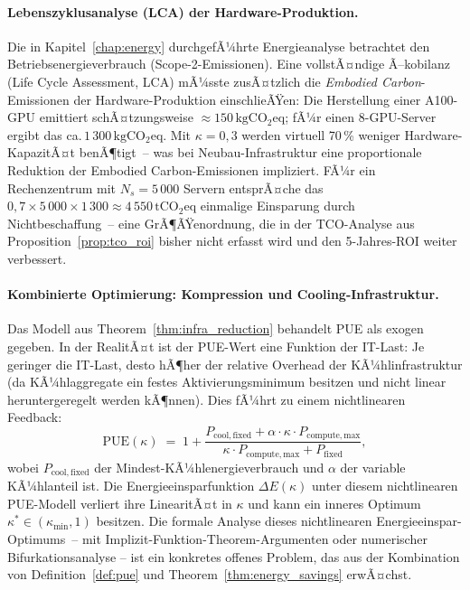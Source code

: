 ﻿\documentclass[12pt, a4paper, openany]{report}
\begin{document}
\paragraph{Lebenszyklusanalyse (LCA) der Hardware-Produktion.}
Die in Kapitel~\ref{chap:energy} durchgefÃ¼hrte Energieanalyse betrachtet
den Betriebsenergieverbrauch (Scope-2-Emissionen).  Eine vollstÃ¤ndige
Ã–kobilanz (Life Cycle Assessment, LCA) mÃ¼sste zusÃ¤tzlich die
\emph{Embodied Carbon}-Emissionen der Hardware-Produktion einschlieÃŸen:
Die Herstellung einer A100-GPU emittiert schÃ¤tzungsweise
$\approx 150\,\mathrm{kgCO_2eq}$; fÃ¼r einen 8-GPU-Server ergibt das
ca.\,$1\,300\,\mathrm{kgCO_2eq}$.  Mit $\kappa = 0{,}3$ werden virtuell
70\,\% weniger Hardware-KapazitÃ¤t benÃ¶tigt~-- was bei Neubau-Infrastruktur
eine proportionale Reduktion der Embodied Carbon-Emissionen impliziert.
FÃ¼r ein Rechenzentrum mit $N_s = 5\,000$ Servern entsprÃ¤che das
$0{,}7 \times 5\,000 \times 1\,300 \approx 4\,550\,\mathrm{tCO_2eq}$
einmalige Einsparung durch Nichtbeschaffung~-- eine GrÃ¶ÃŸenordnung, die in
der TCO-Analyse aus Proposition~\ref{prop:tco_roi} bisher nicht erfasst
wird und den 5-Jahres-ROI weiter verbessert.

\paragraph{Kombinierte Optimierung: Kompression und Cooling-Infrastruktur.}
Das Modell aus Theorem~\ref{thm:infra_reduction} behandelt PUE als exogen
gegeben.  In der RealitÃ¤t ist der PUE-Wert eine Funktion der IT-Last:
Je geringer die IT-Last, desto hÃ¶her der relative Overhead der
KÃ¼hlinfrastruktur (da KÃ¼hlaggregate ein festes Aktivierungsminimum besitzen
und nicht linear heruntergeregelt werden kÃ¶nnen).  Dies fÃ¼hrt zu einem
nichtlinearen Feedback:
\[
  \mathrm{PUE}(\kappa)
  \;=\; 1 + \frac{P_{\mathrm{cool,fixed}} + \alpha \cdot \kappa \cdot P_{\mathrm{compute,max}}}
                  {\kappa \cdot P_{\mathrm{compute,max}} + P_{\mathrm{fixed}}},
\]
wobei $P_{\mathrm{cool,fixed}}$ der Mindest-KÃ¼hlenergieverbrauch und $\alpha$
der variable KÃ¼hlanteil ist.  Die Energieeinsparfunktion $\Delta E(\kappa)$
unter diesem nichtlinearen PUE-Modell verliert ihre LinearitÃ¤t in $\kappa$
und kann ein inneres Optimum $\kappa^* \in (\kappa_{\min}, 1)$ besitzen.
Die formale Analyse dieses nichtlinearen Energieeinspar-Optimums~-- mit
Implizit-Funktion-Theorem-Argumenten oder numerischer Bifurkationsanalyse
-- ist ein konkretes offenes Problem, das aus der Kombination von
Definition~\ref{def:pue} und Theorem~\ref{thm:energy_savings} erwÃ¤chst.
\end{document}
